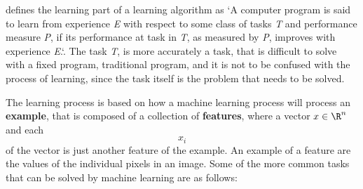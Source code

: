 \documentclass{article}
\begin{document}
\cite{mitchel97} defines the learning part of a learning algorithm as `A computer program is said to learn from experience \textit{E} with respect to some class of tasks \textit{T} and performance measure \textit{P}, if its performance at task in \textit{T}, as measured by \textit{P}, improves with experience \textit{E}.`. The task \textit{T}, is more accurately a task, that is difficult to solve with a fixed program, traditional program, and it is not to be confused with the process of learning, since the task itself is the problem that needs to be solved.

The learning process is based on how a machine learning process will process an \textbf{example}, that is composed of a collection of \textbf{features}, where a vector \(x \in \R^n \) and each $$x_i$$ of the vector is just another feature of the example. An example of a feature are the values of the individual pixels in an image. Some of the more common tasks that can be solved by machine learning are as follows:
\end{document}
